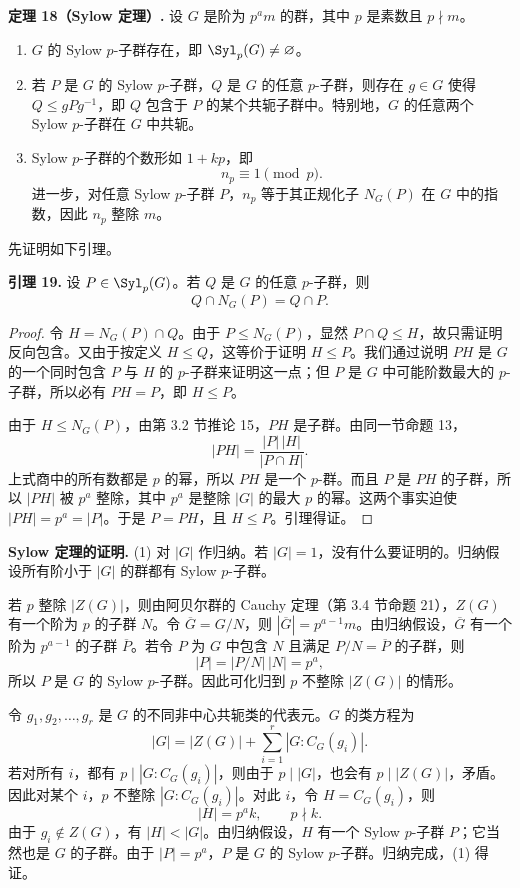\medskip
\noindent\textbf{定理 18（Sylow 定理）.} 设 $G$ 是阶为 $p^am$ 的群，其中 $p$ 是素数且 $p\nmid m$。
\begin{enumerate}[label=(\arabic*)]
  \item $G$ 的 Sylow $p$-子群存在，即 $\Syl_p(G)\neq\varnothing$。
  \item 若 $P$ 是 $G$ 的 Sylow $p$-子群，$Q$ 是 $G$ 的任意 $p$-子群，则存在 $g\in G$ 使得 $Q\leq gPg^{-1}$，即 $Q$ 包含于 $P$ 的某个共轭子群中。特别地，$G$ 的任意两个 Sylow $p$-子群在 $G$ 中共轭。
  \item Sylow $p$-子群的个数形如 $1+kp$，即
  \[
    n_p\equiv1\pmod p.
  \]
  进一步，对任意 Sylow $p$-子群 $P$，$n_p$ 等于其正规化子 $N_G(P)$ 在 $G$ 中的指数，因此 $n_p$ 整除 $m$。
\end{enumerate}

先证明如下引理。

\medskip
\noindent\textbf{引理 19.} 设 $P\in\Syl_p(G)$。若 $Q$ 是 $G$ 的任意 $p$-子群，则
\[
  Q\cap N_G(P)=Q\cap P.
\]

\begin{proof}
令 $H=N_G(P)\cap Q$。由于 $P\leq N_G(P)$，显然 $P\cap Q\leq H$，故只需证明反向包含。又由于按定义 $H\leq Q$，这等价于证明 $H\leq P$。我们通过说明 $PH$ 是 $G$ 的一个同时包含 $P$ 与 $H$ 的 $p$-子群来证明这一点；但 $P$ 是 $G$ 中可能阶数最大的 $p$-子群，所以必有 $PH=P$，即 $H\leq P$。

由于 $H\leq N_G(P)$，由第 3.2 节推论 15，$PH$ 是子群。由同一节命题 13，
\[
  |PH|=\frac{|P|\,|H|}{|P\cap H|}.
\]
上式商中的所有数都是 $p$ 的幂，所以 $PH$ 是一个 $p$-群。而且 $P$ 是 $PH$ 的子群，所以 $|PH|$ 被 $p^a$ 整除，其中 $p^a$ 是整除 $|G|$ 的最大 $p$ 的幂。这两个事实迫使 $|PH|=p^a=|P|$。于是 $P=PH$，且 $H\leq P$。引理得证。
\end{proof}

\noindent\textbf{Sylow 定理的证明.}
(1) 对 $|G|$ 作归纳。若 $|G|=1$，没有什么要证明的。归纳假设所有阶小于 $|G|$ 的群都有 Sylow $p$-子群。

若 $p$ 整除 $|Z(G)|$，则由阿贝尔群的 Cauchy 定理（第 3.4 节命题 21），$Z(G)$ 有一个阶为 $p$ 的子群 $N$。令 $\overline G=G/N$，则 $|\overline G|=p^{a-1}m$。由归纳假设，$\overline G$ 有一个阶为 $p^{a-1}$ 的子群 $\overline P$。若令 $P$ 为 $G$ 中包含 $N$ 且满足 $P/N=\overline P$ 的子群，则
\[
  |P|=|P/N|\,|N|=p^a,
\]
所以 $P$ 是 $G$ 的 Sylow $p$-子群。因此可化归到 $p$ 不整除 $|Z(G)|$ 的情形。

令 $g_1,g_2,\ldots,g_r$ 是 $G$ 的不同非中心共轭类的代表元。$G$ 的类方程为
\[
  |G|=|Z(G)|+\sum_{i=1}^r |G:C_G(g_i)|.
\]
若对所有 $i$，都有 $p\mid |G:C_G(g_i)|$，则由于 $p\mid |G|$，也会有 $p\mid |Z(G)|$，矛盾。因此对某个 $i$，$p$ 不整除 $|G:C_G(g_i)|$。对此 $i$，令 $H=C_G(g_i)$，则
\[
  |H|=p^ak,
  \qquad p\nmid k.
\]
由于 $g_i\notin Z(G)$，有 $|H|<|G|$。由归纳假设，$H$ 有一个 Sylow $p$-子群 $P$；它当然也是 $G$ 的子群。由于 $|P|=p^a$，$P$ 是 $G$ 的 Sylow $p$-子群。归纳完成，(1) 得证。

